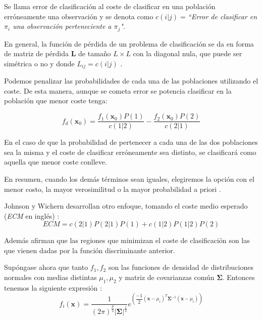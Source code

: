 \begin{defi}
Se llama error de clasificación al coste de clasificar en una población erróneamente una observación y se denota como $c(i|j)=$\emph{``Error de clasificar en $\pi_i$ una observación perteneciente a $\pi_j$"}.
\end{defi}

\noindent En general, la función de pérdida de un problema de clasificación se da en forma de matriz de pérdida $\mathbf{L}$ de tamaño $L\times L$ con la diagonal nula, que puede ser simétrica o no y donde $L_{ij}=c(i|j)$ \cite{Hastie 2001}. 

\noindent Podemos penalizar las probabilidades de cada una de las poblaciones utilizando el coste. De esta manera, aunque se cometa error se potencia clasificar en la población que menor coste tenga:

\begin{equation}
f_d(\mathbf{x}_0)=\dfrac{f_1(\textbf{x}_0)P(1)}{c(1|2)}-\dfrac{f_2(\textbf{x}_0)P(2)}{c(2|1)}
\end{equation}

\noindent En el caso de que la probabilidad de pertenecer a cada una de las dos poblaciones sea la misma y el coste de clasificar erróneamente sea distinto, se clasificará como aquella que menor coste conlleve.

\noindent En resumen, cuando los demás términos sean iguales, elegiremos la opción con el menor costo, la mayor verosimilitud o la mayor probabilidad a priori \cite{Peña 2002}.

\noindent Johnson  y Wichern  desarrollan otro enfoque, tomando el coste medio esperado (\emph{ECM} en inglés) \cite{Johnson 2007}:
\begin{equation}
ECM=c(2|1)P(2|1)P(1)+c(1|2)P(1|2)P(2)
\end{equation}

\noindent Además afirman que las regiones que minimizan el coste de clasificación son las que vienen dadas por la función discriminante anterior. 

\noindent Supóngase ahora que tanto $f_1,f_2$ son las funciones de densidad de distribuciones normales con medias distintas $\mu_1,\mu_2$ y matriz de covarianzas común $\mathbf{\Sigma}$. Entonces tenemos la siguiente expresión \cite{ Cuadras 2014, Johnson 2007}:
\begin{equation}
f_i(\textbf{x})=\dfrac{1}{(2\pi)^{\frac{p}{2}}|\mathbf{\Sigma}|^{\frac{1}{2}}} e^{ \left(\dfrac{-1}{2}(\textbf{x}-\mu_i)^T \mathbf{\Sigma}^{-1}(\textbf{x}-\mu_i) \right)}
\end{equation}

